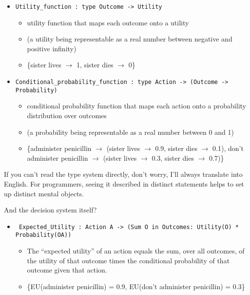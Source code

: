 {\begin{itemize}
\item \texttt{Utility\_function : type Outcome -{\textgreater} Utility}
  \begin{itemize}
    \item utility
      function that maps each outcome onto a utility
    \item (a utility being
      representable as a real number between negative and positive infinity)
    \item \{sister lives $\rightarrow $ 1,
      sister dies $\rightarrow $ 0\}
  \end{itemize}

\item \texttt{Conditional\_probability\_function :\newline
  type Action -{\textgreater} (Outcome -{\textgreater} Probability)}
  \begin{itemize}
    \item conditional probability function that maps each action onto a
      probability distribution over outcomes
    \item (a probability being
      representable as a real number between 0 and 1)
    \item \{administer penicillin $\rightarrow
$ (sister lives $\rightarrow $ 0.9, sister dies $\rightarrow $ 0.1),
don't administer penicillin $\rightarrow $ (sister
lives $\rightarrow $ 0.3, sister dies $\rightarrow $
0.7)\}
  \end{itemize}
\end{itemize}

{
 If you can't read the type system directly,
don't worry, I'll always translate into
English. For programmers, seeing it described in distinct statements
helps to set up distinct mental objects.}

{
 And the decision system itself?}

\begin{itemize}
\item \texttt{ Expected\_Utility : Action A -{\textgreater}\newline
  (Sum O in Outcomes: Utility(O) * Probability(O{\textbar}A))}
  \begin{itemize}
    \item  The ``expected utility'' of an action
equals the sum, over all outcomes, of the utility of that outcome times
the conditional probability of that outcome given that action.
\item \{EU(administer penicillin) = 0.9,
EU(don't administer penicillin) =
0.3\}
  \end{itemize}


\end{itemize}}
